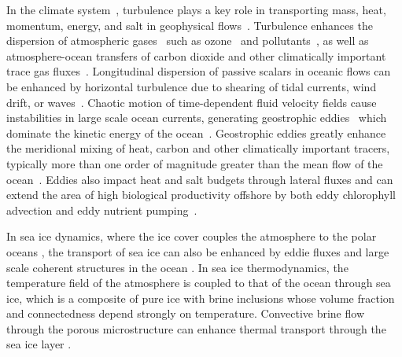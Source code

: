 \documentclass[leqno,onefignum,onetabnum]{siamltex1213}
\begin{document}
In the climate
system~\cite{Csanady:1973:9789027702609,Griffies:2003:10.1007},
turbulence plays a key role in transporting mass, heat, momentum,
energy, and salt in geophysical
flows~\cite{Moffatt:RPP:621}. Turbulence enhances the dispersion of
atmospheric gases~\cite{Espinosa:MET1292} such as
ozone~\cite{Holton:JGRC2495,Pitari:JGR:1986,Plumb:JAS:1979,Plumb:JAS:1987}
and
pollutants~\cite{Bilger:10.1175,Beychok:1994:9780964458802,Samson:1988:88009978},
as well as atmosphere-ocean transfers of carbon dioxide and other
climatically important trace gas
fluxes~\cite{Zappa:2007:67613,Banerjee:10.1007}.  Longitudinal
dispersion of passive scalars in oceanic flows can be enhanced by
horizontal turbulence due to shearing of tidal currents, wind drift,
or
waves~\cite{Young:JPO:1982:515,Kullenberg:1972:TUS1529,Bowden:JFM:1965}.   
Chaotic motion of 
time-dependent fluid velocity fields cause instabilities in large
scale ocean currents, generating geostrophic
eddies~\cite{Ferrari:JPO:1501} which dominate the kinetic energy of
the ocean~\cite{Ferrari:ARFM:253}. Geostrophic
eddies greatly enhance~\cite{Ferrari:JPO:1501} the meridional mixing
of heat, carbon and other climatically important tracers, typically
more than one order of magnitude greater than the mean flow of the
ocean~\cite{Souza:OS:317}. Eddies also impact heat and salt budgets
through lateral fluxes and can extend the area of high biological
productivity offshore by both eddy chlorophyll advection and eddy
nutrient pumping~\cite{Chaigneau:JGR:C11025}. 

In sea ice dynamics,
where the ice cover couples the atmosphere to the polar
oceans \cite{Washington:1986:9780935702521}, the transport of sea 
ice can also be enhanced by eddie
fluxes and large scale coherent structures in the ocean
\cite{Watanabe:2009JPO4010,Lukovich:AG:2015}. 
In sea ice thermodynamics, the temperature field of the 
atmosphere is coupled to that of the ocean through sea ice,
which is a composite of pure ice with brine inclusions
whose volume fraction and connectedness depend strongly
on temperature.
Convective brine flow through the porous
microstructure can enhance thermal transport through the sea ice layer
\cite{Lytle:JGR-8853,Worster:PTRSA:2015,Liu:2015}.
\end{document}
